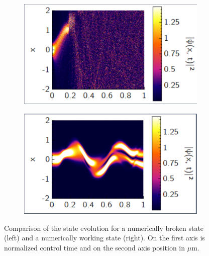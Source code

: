 \documentclass[a4paper, twocolumn]{revtex4-1}
\begin{document}
\begin{figure}
	\begin{subfigure}{0.45\columnwidth}
		\includegraphics[width=\columnwidth]{graphics/clustering/QM2Clusteringk4A04T06178-2.PNG}
	\end{subfigure}
	\begin{subfigure}{0.45\columnwidth}
		\includegraphics[width=\columnwidth]{graphics/clustering/QM2Clusteringk5A015T07475-2.PNG}
	\end{subfigure}
	\caption{Comparison of the state evolution for a numerically broken state (left) and a numerically working state (right). On the first axis is normalized control time and on the second axis position in $\mu$m.}
	\label{fig:statePlots}
\end{figure}
\end{document}

